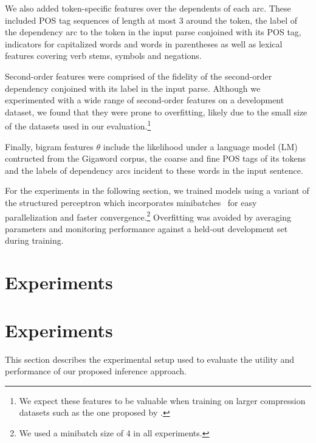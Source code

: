 \documentclass[11pt,a4paper]{article}
\begin{document}
We also added token-specific features over the dependents of each
arc. These included POS tag sequences of length at most 3 around the token,
the label of the dependency arc to the token in the
input parse conjoined with its POS tag, indicators for
capitalized words and words in parentheses as well as lexical features
covering verb stems, symbols and negations.

Second-order features were comprised of the fidelity of the
second-order dependency conjoined with its label in the input parse.
Although we experimented with a wide range of second-order features on
a development dataset, we found that they were prone to overfitting,
likely due to the small size of the 
datasets used in our evaluation.\footnote{We
    expect these features to be valuable when training on larger
    compression datasets such as the one proposed by
    .}

Finally, bigram features $\theta$ include the likelihood under a
language model (LM) contructed from the Gigaword corpus, the coarse and
fine POS tags of its tokens and the labels of dependency arcs incident to
these words in the input sentence.

For the experiments in the following section, we trained models using
a variant of the structured perceptron \cite{collins02}
which incorporates minibatches~\cite{zhao13} for easy parallelization and
faster convergence.\footnote{
    We used a minibatch size of 4 in all experiments.}
Overfitting was avoided by averaging parameters and monitoring performance
against a held-out development set during training.

\section{Experiments}
\label{experiments}

\section{Experiments}
\label{experiments}

This section describes the experimental setup used to evaluate the
utility and performance of our proposed inference approach.
\end{document}

